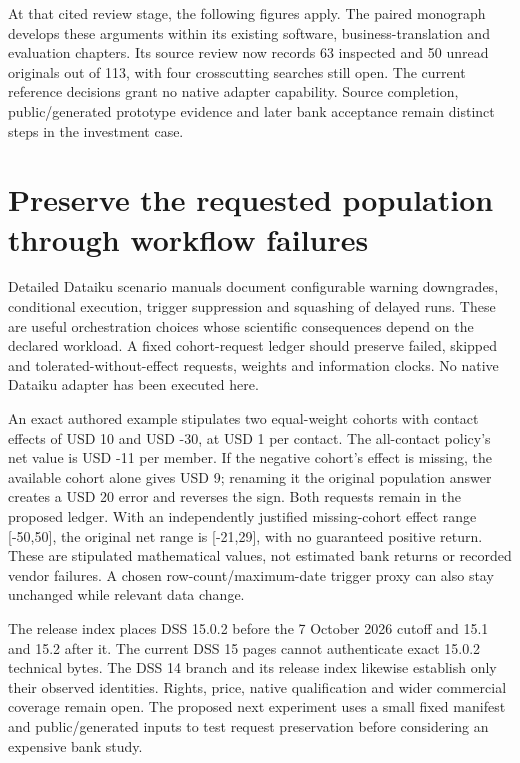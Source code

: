 At that cited review stage, the following figures apply. The paired
monograph develops these arguments within its existing software,
business-translation and evaluation chapters. Its source review now
records 63 inspected and 50 unread originals out of 113, with four
crosscutting searches still open. The current reference decisions grant
no native adapter capability. Source completion, public/generated
prototype evidence and later bank acceptance remain distinct steps in
the investment case. \citep{sp23nt_reader,sp23nt_progress}

\hypertarget{preserve-the-requested-population-through-workflow-failures}{%
\section{Preserve the requested population through workflow
failures}\label{preserve-the-requested-population-through-workflow-failures}}

Detailed Dataiku scenario manuals document configurable warning
downgrades, conditional execution, trigger suppression and squashing of
delayed runs. These are useful orchestration choices whose scientific
consequences depend on the declared workload. A fixed cohort-request
ledger should preserve failed, skipped and tolerated-without-effect
requests, weights and information clocks. No native Dataiku adapter has
been executed here.
\citep{exec23_dss_latest_flow,exec23_dss_latest_triggers,exec23_dss_latest_steps,exec23_dss_dss14_flow}

An exact authored example stipulates two equal-weight cohorts with
contact effects of USD 10 and USD -30, at USD 1 per contact. The
all-contact policy's net value is USD -11 per member. If the negative
cohort's effect is missing, the available cohort alone gives USD 9;
renaming it the original population answer creates a USD 20 error and
reverses the sign. Both requests remain in the proposed ledger. With an
independently justified missing-cohort effect range {[}-50,50{]}, the
original net range is {[}-21,29{]}, with no guaranteed positive return.
These are stipulated mathematical values, not estimated bank returns or
recorded vendor failures. A chosen row-count/maximum-date trigger proxy
can also stay unchanged while relevant data change.
\citep{exec23_dss_denominator_reference}

The release index places DSS 15.0.2 before the 7 October 2026 cutoff and
15.1 and 15.2 after it. The current DSS 15 pages cannot authenticate
exact 15.0.2 technical bytes. The DSS 14 branch and its release index
likewise establish only their observed identities. Rights, price, native
qualification and wider commercial coverage remain open. The proposed
next experiment uses a small fixed manifest and public/generated inputs
to test request preservation before considering an expensive bank study.
\citep{exec23_dss_latest_releases,exec23_dss_dss14_releases}

